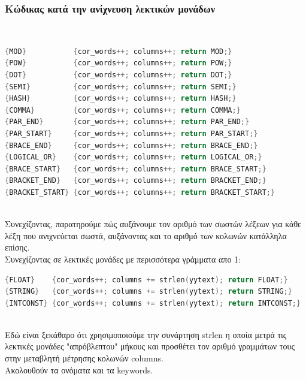 \documentclass[14pt]{extarticle}
\begin{document}
\subsubsection{Κώδικας κατά την ανίχνευση λεκτικών μονάδων}
\\
\begin{lstlisting}[language=C]
%%
{MOD}           {cor_words++; columns++; return MOD;}
{POW}           {cor_words++; columns++; return POW;}
{DOT}           {cor_words++; columns++; return DOT;}
{SEMI}          {cor_words++; columns++; return SEMI;}
{HASH}          {cor_words++; columns++; return HASH;}
{COMMA}         {cor_words++; columns++; return COMMA;}
{PAR_END}       {cor_words++; columns++; return PAR_END;}
{PAR_START}     {cor_words++; columns++; return PAR_START;}
{BRACE_END}     {cor_words++; columns++; return BRACE_END;}
{LOGICAL_OR}    {cor_words++; columns++; return LOGICAL_OR;}
{BRACE_START}   {cor_words++; columns++; return BRACE_START;}
{BRACKET_END}   {cor_words++; columns++; return BRACKET_END;}
{BRACKET_START} {cor_words++; columns++; return BRACKET_START;}
\end{lstlisting}
\\
Συνεχίζοντας, παρατηρούμε πώς αυξάνουμε τον αριθμό των σωστών λέξεων για κάθε λέξη που
ανιχνεύεται σωστά, αυξάνοντας και το αριθμό των κολωνών κατάλληλα επίσης.
\\
Συνεχίζοντας σε λεκτικές μονάδες με περισσότερα γράμματα απο 1:
\begin{lstlisting}[language=C]
{FLOAT}    {cor_words++; columns += strlen(yytext); return FLOAT;}
{STRING}   {cor_words++; columns += strlen(yytext); return STRING;}
{INTCONST} {cor_words++; columns += strlen(yytext); return INTCONST;}
\end{lstlisting}
\\
Εδώ είναι ξεκάθαρο ότι χρησιμοποιούμε την συνάρτηση strlen η οποία μετρά τις
λεκτικές μονάδες "απρόβλεπτου" μήκους και προσθέτει τον αριθμό γραμμάτων τους
στην μεταβλητή μέτρησης κολωνών columns.
\\
Ακολουθούν τα ονόματα και τα keywords.
\end{document}
